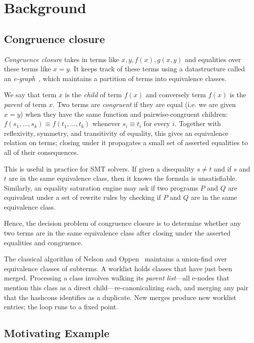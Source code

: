\section{Background}
\label{sec:background}

\subsection{Congruence closure}

\emph{Congruence closure} takes in terms like $x, y, f(x), g(x, y)$ and
equalities over these terms like $x = y$. It keeps track of these terms using a
datastructure called an \emph{e-graph}~\cite{egraphs}, which
maintains a partition of terms into equivalence classes.

We say that term $x$ is the \emph{child} of term $f(x)$ and conversely term
$f(x)$ is the \emph{parent} of term $x$. Two terms are \emph{congruent} if they
are equal (i.e. we are given $x = y$) when they have the same function and
pairwise-congruent children: $f(s_1, \ldots, s_k) \equiv f(t_1, \ldots, t_k)$
whenever $s_i \equiv t_i$ for every $i$. Together with reflexivity, symmetry,
and transitivity of equality, this gives an equivalence relation on terms;
closing under it propagates a small set of asserted equalities to all of their
consequences.

This is useful in practice for SMT solvers. If given a disequality $s \neq t$
and if $s$ and $t$ are in the same equivalence class, then it knows the formula
is unsatisfiable. Similarly, an equality saturation engine may ask if two
programs $P$ and $Q$ are equivalent under a set of rewrite rules by checking if
$P$ and $Q$ are in the same equivalence class.

Hence, the decision problem of congruence closure is to determine whether any
two terms are in the same equivalence class after closing under the asserted
equalities and congruence.

The classical algorithm of Nelson and Oppen~\cite{nelson-oppen-cc} maintains a
union-find over equivalence classes of subterms. A worklist holds classes that
have just been merged. Processing a class involves walking its \emph{parent
list}---all e-nodes that mention this class as a direct
child---re-canonicalizing each, and merging any pair that the hashcons
identifies as a duplicate. New merges produce new worklist entries; the loop
runs to a fixed point. 

\subsection{Motivating Example}
\label{sec:bg:motivating}

